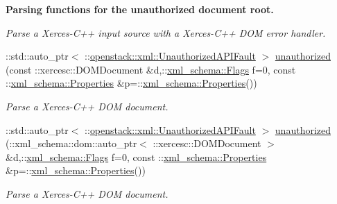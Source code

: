 \begin{Indent}{\bf Parsing functions for the unauthorized document root.}
\begin{DoxyCompactItemize}
\begin{DoxyCompactList}\small\item\em Parse a Xerces-\/C++ input source with a Xerces-\/C++ DOM error handler. \item\end{DoxyCompactList}\item 
::std::auto\_\-ptr$<$ ::\hyperlink{classopenstack_1_1xml_1_1UnauthorizedAPIFault}{openstack::xml::UnauthorizedAPIFault} $>$ \hyperlink{namespaceopenstack_1_1xml_a22ff8de913e29a31389758b68f0114bb}{unauthorized} (const ::xercesc::DOMDocument \&d,::\hyperlink{namespacexml__schema_affb4c227cbd9aa7453dd1dc5a1401943}{xml\_\-schema::Flags} f=0, const ::\hyperlink{namespacexml__schema_ad27ce19a7ee1d3b1064092648898f64c}{xml\_\-schema::Properties} \&p=::\hyperlink{namespacexml__schema_ad27ce19a7ee1d3b1064092648898f64c}{xml\_\-schema::Properties}())
\begin{DoxyCompactList}\small\item\em Parse a Xerces-\/C++ DOM document. \item\end{DoxyCompactList}\item 
::std::auto\_\-ptr$<$ ::\hyperlink{classopenstack_1_1xml_1_1UnauthorizedAPIFault}{openstack::xml::UnauthorizedAPIFault} $>$ \hyperlink{namespaceopenstack_1_1xml_a0281a3dc65e29bd5b8f0980b103a9463}{unauthorized} (::xml\_\-schema::dom::auto\_\-ptr$<$ ::xercesc::DOMDocument $>$ \&d,::\hyperlink{namespacexml__schema_affb4c227cbd9aa7453dd1dc5a1401943}{xml\_\-schema::Flags} f=0, const ::\hyperlink{namespacexml__schema_ad27ce19a7ee1d3b1064092648898f64c}{xml\_\-schema::Properties} \&p=::\hyperlink{namespacexml__schema_ad27ce19a7ee1d3b1064092648898f64c}{xml\_\-schema::Properties}())
\begin{DoxyCompactList}\small\item\em Parse a Xerces-\/C++ DOM document. \item\end{DoxyCompactList}\end{DoxyCompactItemize}
\end{Indent}
